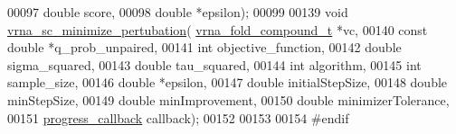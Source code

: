 \begin{DoxyCode}
00097                                   \textcolor{keywordtype}{double}  score,
00098                                   \textcolor{keywordtype}{double}  *epsilon);
00099 
00139 \textcolor{keywordtype}{void} \mbox{\hyperlink{group__perturbation_gaa124bdc20d88001c38ade590c4bcc3c4}{vrna\_sc\_minimize\_pertubation}}(
      \mbox{\hyperlink{group__fold__compound_structvrna__fc__s}{vrna\_fold\_compound\_t}}  *vc,
00140                                   \textcolor{keyword}{const} \textcolor{keywordtype}{double}          *q\_prob\_unpaired,
00141                                   \textcolor{keywordtype}{int}                   objective\_function,
00142                                   \textcolor{keywordtype}{double}                sigma\_squared,
00143                                   \textcolor{keywordtype}{double}                tau\_squared,
00144                                   \textcolor{keywordtype}{int}                   algorithm,
00145                                   \textcolor{keywordtype}{int}                   sample\_size,
00146                                   \textcolor{keywordtype}{double}                *epsilon,
00147                                   \textcolor{keywordtype}{double}                initialStepSize,
00148                                   \textcolor{keywordtype}{double}                minStepSize,
00149                                   \textcolor{keywordtype}{double}                minImprovement,
00150                                   \textcolor{keywordtype}{double}                minimizerTolerance,
00151                                   \mbox{\hyperlink{group__perturbation_gaa715397c7afd2d2955c315512a3d571a}{progress\_callback}}     callback);
00152 
00153 
00154 \textcolor{preprocessor}{#endif}
\end{DoxyCode}
